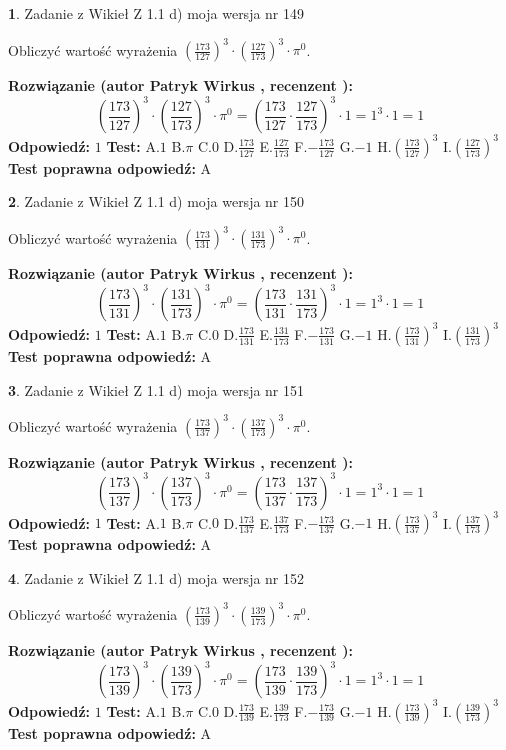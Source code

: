 \documentclass[12pt, a4paper]{article}
\theoremstyle{definition} %
\newtheorem{zad}{}
\newcommand{\zadStart}[1]{\begin{zad}#1\newline}
\newcommand{\zadStop}{\end{zad}}
\newcommand{\rozwStart}[2]{\noindent \textbf{Rozwiązanie (autor #1 , recenzent #2): }\newline}
\newcommand{\rozwStop}{\newline}
\newcommand{\odpStart}{\noindent \textbf{Odpowiedź:}\newline}
\newcommand{\odpStop}{\newline}
\newcommand{\testStart}{\noindent \textbf{Test:}\newline}
\newcommand{\testStop}{\newline}
\newcommand{\kluczStart}{\noindent \textbf{Test poprawna odpowiedź:}\newline}
\newcommand{\kluczStop}{\newline}
\begin{document}
\zadStart{Zadanie z Wikieł Z 1.1 d) moja wersja nr 149}

Obliczyć wartość wyrażenia $(\frac{173}{127})^{3} \cdot (\frac{127}{173})^{3} \cdot \pi^{0}$.
\zadStop
\rozwStart{Patryk Wirkus}{}
$$(\frac{173}{127})^{3} \cdot (\frac{127}{173})^{3} \cdot \pi^{0} = (\frac{173}{127} \cdot \frac{127}{173})^{3} \cdot 1 = 1^{3} \cdot 1 = 1$$
\rozwStop
\odpStart
$1$
\odpStop
\testStart
A.$1$ B.$\pi$ C.$0$ D.$\frac{173}{127}$ E.$\frac{127}{173}$
F.$-\frac{173}{127}$ G.$-1$
H.$(\frac{173}{127})^{3}$
I.$(\frac{127}{173})^{3}$
\testStop
\kluczStart
A
\kluczStop



\zadStart{Zadanie z Wikieł Z 1.1 d) moja wersja nr 150}

Obliczyć wartość wyrażenia $(\frac{173}{131})^{3} \cdot (\frac{131}{173})^{3} \cdot \pi^{0}$.
\zadStop
\rozwStart{Patryk Wirkus}{}
$$(\frac{173}{131})^{3} \cdot (\frac{131}{173})^{3} \cdot \pi^{0} = (\frac{173}{131} \cdot \frac{131}{173})^{3} \cdot 1 = 1^{3} \cdot 1 = 1$$
\rozwStop
\odpStart
$1$
\odpStop
\testStart
A.$1$ B.$\pi$ C.$0$ D.$\frac{173}{131}$ E.$\frac{131}{173}$
F.$-\frac{173}{131}$ G.$-1$
H.$(\frac{173}{131})^{3}$
I.$(\frac{131}{173})^{3}$
\testStop
\kluczStart
A
\kluczStop



\zadStart{Zadanie z Wikieł Z 1.1 d) moja wersja nr 151}

Obliczyć wartość wyrażenia $(\frac{173}{137})^{3} \cdot (\frac{137}{173})^{3} \cdot \pi^{0}$.
\zadStop
\rozwStart{Patryk Wirkus}{}
$$(\frac{173}{137})^{3} \cdot (\frac{137}{173})^{3} \cdot \pi^{0} = (\frac{173}{137} \cdot \frac{137}{173})^{3} \cdot 1 = 1^{3} \cdot 1 = 1$$
\rozwStop
\odpStart
$1$
\odpStop
\testStart
A.$1$ B.$\pi$ C.$0$ D.$\frac{173}{137}$ E.$\frac{137}{173}$
F.$-\frac{173}{137}$ G.$-1$
H.$(\frac{173}{137})^{3}$
I.$(\frac{137}{173})^{3}$
\testStop
\kluczStart
A
\kluczStop



\zadStart{Zadanie z Wikieł Z 1.1 d) moja wersja nr 152}

Obliczyć wartość wyrażenia $(\frac{173}{139})^{3} \cdot (\frac{139}{173})^{3} \cdot \pi^{0}$.
\zadStop
\rozwStart{Patryk Wirkus}{}
$$(\frac{173}{139})^{3} \cdot (\frac{139}{173})^{3} \cdot \pi^{0} = (\frac{173}{139} \cdot \frac{139}{173})^{3} \cdot 1 = 1^{3} \cdot 1 = 1$$
\rozwStop
\odpStart
$1$
\odpStop
\testStart
A.$1$ B.$\pi$ C.$0$ D.$\frac{173}{139}$ E.$\frac{139}{173}$
F.$-\frac{173}{139}$ G.$-1$
H.$(\frac{173}{139})^{3}$
I.$(\frac{139}{173})^{3}$
\testStop
\kluczStart
A
\kluczStop
\end{document}

